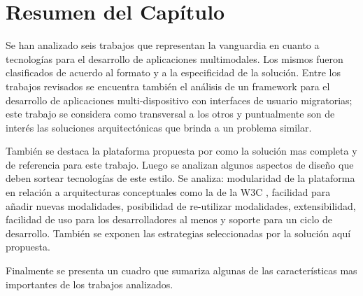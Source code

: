 \section{Resumen del Capítulo}\label{sec:estado_arte_summary}
Se han analizado seis trabajos que representan la vanguardia en cuanto a tecnologías para el desarrollo de aplicaciones multimodales. Los mismos fueron clasificados de acuerdo al formato y a la especificidad de la solución. Entre los trabajos revisados se encuentra también el análisis de un framework para el desarrollo de aplicaciones multi-dispositivo con interfaces de usuario migratorias; este trabajo se considera como transversal a los otros y puntualmente son de interés las soluciones arquitectónicas que brinda a un problema similar. 

También se destaca la plataforma propuesta por \citet*{lo2013chameleon} como la solución mas completa y de referencia para este trabajo. Luego se analizan algunos aspectos de diseño que deben sortear tecnologías de este estilo. Se analiza: modularidad de la plataforma en relación a arquitecturas conceptuales como la de la W3C \citep{w3c:mmiarch}, facilidad para añadir nuevas modalidades, posibilidad de re-utilizar modalidades, extensibilidad, facilidad de uso para los desarrolladores al menos y soporte para un ciclo de desarrollo. También se exponen las estrategias seleccionadas por la solución aquí propuesta. 

Finalmente se presenta un cuadro que sumariza algunas de las características mas importantes de los trabajos analizados.

